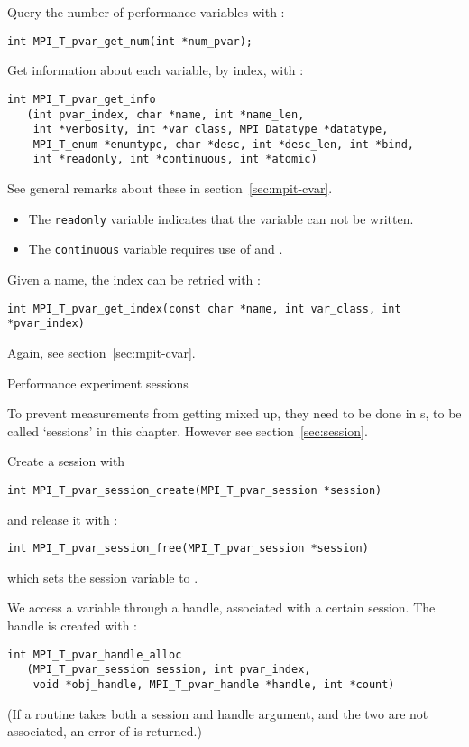Query the number of performance variables with :
\begin{lstlisting}
int MPI_T_pvar_get_num(int *num_pvar);
\end{lstlisting}
Get information about each variable, by index, with :
\begin{lstlisting}
int MPI_T_pvar_get_info
   (int pvar_index, char *name, int *name_len,
    int *verbosity, int *var_class, MPI_Datatype *datatype,
    MPI_T_enum *enumtype, char *desc, int *desc_len, int *bind,
    int *readonly, int *continuous, int *atomic)
\end{lstlisting}
See general remarks about these in section~\ref{sec:mpit-cvar}.
\begin{itemize}
\item The \lstinline{readonly} variable indicates that the variable can not be written.
\item The \lstinline{continuous} variable requires use of
   and .
\end{itemize}

Given a name, the index can be retried with :
\begin{lstlisting}
int MPI_T_pvar_get_index(const char *name, int var_class, int *pvar_index)
\end{lstlisting}
Again, see section~\ref{sec:mpit-cvar}.

 {Performance experiment sessions}

To prevent measurements from getting mixed up, they need to be done in
s,
to be called `sessions' in this chapter.
However see section~\ref{sec:session}.

Create a session with 
\begin{lstlisting}
int MPI_T_pvar_session_create(MPI_T_pvar_session *session)
\end{lstlisting}
and release it with :
\begin{lstlisting}
int MPI_T_pvar_session_free(MPI_T_pvar_session *session)
\end{lstlisting}
which sets the session variable to .

We access a variable through a handle, associated with a certain session.
The handle is created with :
\begin{lstlisting}
int MPI_T_pvar_handle_alloc
   (MPI_T_pvar_session session, int pvar_index,
    void *obj_handle, MPI_T_pvar_handle *handle, int *count)
\end{lstlisting}
(If a routine takes both a session and handle argument, and
the two are not associated, an error of 
is returned.)

